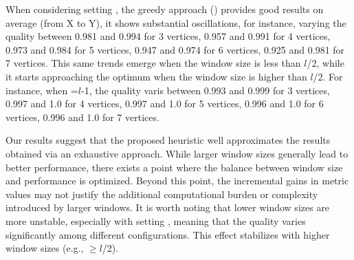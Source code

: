 When considering setting \average, the greedy approach () provides good results on average (from X to Y), it shows substantial oscillations, for instance, varying the quality between 0.981 and 0.994 for 3 vertices, 0.957 and 0.991 for 4 vertices, 0.973 and 0.984 for 5 vertices, 0.947 and 0.974 for 6 vertices, 0.925 and 0.981 for 7 vertices. This same trends emerge when the window size is less than $l$/2, while it starts approaching the optimum when the window size is higher than $l$/2. For instance, when \windowsize=$l$-1, the quality varis between  0.993 and  0.999 for 3 vertices, 0.997 and 1.0 for 4 vertices, 0.997 and 1.0 for 5 vertices, 0.996 and 1.0 for 6 vertices, 0.996 and 1.0 for 7 vertices.


Our results suggest that the proposed heuristic well approximates the results obtained via an exhaustive approach. While larger window sizes generally lead to better performance, there exists a point where the balance between window size and performance is optimized. Beyond this point, the incremental gains in metric values may not justify the additional computational burden or complexity introduced by larger windows. It is worth noting that lower window sizes are more unstable, especially with setting \wide, meaning that the quality varies significantly among different configurations. This effect stabilizes with higher window sizes (e.g., \windowsize$\geq$$l$/2).

